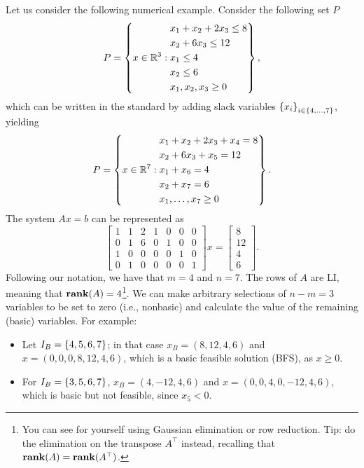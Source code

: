 Let us consider the following numerical example. Consider the following set $P$
%
\begin{equation*}
	P = \left\{x \in \mathbb{R}^3 :  
		\begin{aligned}
			& x_1 + x_2 + 2x_3 \le 8 \\
			& x_2 + 6 x_3 \le 12 \\
			& x_1 \le 4 \\
			& x_2 \le 6 \\
			& x_1, x_2, x_3 \ge 0
		\end{aligned}
		\right\}, 	
\end{equation*}
%
which can be written in the standard by adding slack variables $\left\{ x_i \right \}_{i \in \{4,\dots,7\}}$, yielding 
%
\begin{equation}  \label{p1c3:eq:example_P}
	P = \left\{x \in \mathbb{R}^7 :  
		\begin{aligned}
			& x_1 + x_2 + 2x_3 + x_4 = 8 \\
			& x_2 + 6 x_3 + x_5 = 12 \\
			& x_1 + x_6 = 4 \\
			& x_2 + x_7 =6 \\
			& x_1, \dots, x_7 \ge 0
		\end{aligned}
		\right\}. 	
\end{equation}
%
The system $Ax=b$ can be represented as 
%  
\begin{equation*}
	\begin{bmatrix}
		1 & 1 & 2 & 1 & 0 & 0 & 0 \\
		0 & 1 & 6 & 0 & 1 & 0 & 0 \\
		1 & 0 & 0 & 0 & 0 & 1 & 0 \\
		0 & 1 & 0 & 0 & 0 & 0 & 1
	\end{bmatrix} x =
	\begin{bmatrix}
		8  \\
		12 \\
		4  \\
		6   	
	\end{bmatrix}.
\end{equation*}
%
Following our notation, we have that $m = 4$ and $n = 7$. The rows of $A$ are LI, meaning that $\mathop{\bf rank}(A) = 4$\footnote{You can see for yourself using Gaussian elimination or row reduction. Tip: do the elimination on the transpose $A^\top$ instead, recalling that $\mathop{\bf rank}(A) = \mathop{\bf rank}(A^\top)$.}. We can make arbitrary selections of $n-m = 3$ variables to be set to zero (i.e., nonbasic) and calculate the value of the remaining (basic) variables. For example:
\begin{itemize}
	\item Let $I_B = \left\{ 4, 5, 6, 7 \right \}$; in that case $x_B = (8,12,4,6)$ and $x = (0,0,0,8,12,4,6)$, which is a basic feasible solution (BFS), as $x \geq 0$.
	\item For $I_B = \left\{ 3,5,6,7 \right \}$, $x_B = (4,-12,4,6)$ and $x = (0, 0, 4, 0, -12, 4, 6)$, which is basic but not feasible, since $x_5 < 0$.	
\end{itemize}



